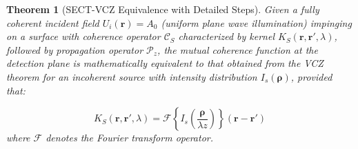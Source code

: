 \documentclass[a4paper,12pt]{article}
\newtheorem{theorem}{Theorem}[section]
\begin{document}
\begin{theorem}[SECT-VCZ Equivalence with Detailed Steps]
Given a fully coherent incident field $U_i(\mathbf{r}) = A_0$ (uniform plane wave illumination) impinging on a 
surface with coherence operator $\mathcal{C}_S$ characterized by kernel $K_S(\mathbf{r}, \mathbf{r}', \lambda)$, 
followed by propagation operator $\mathcal{P}_z$, the mutual coherence function at the detection plane is mathematically 
equivalent to that obtained from the VCZ theorem for an incoherent source with intensity distribution $I_s(\mathbf{\rho})$, 
provided that:

\begin{equation}
K_S(\mathbf{r}, \mathbf{r}', \lambda) = \mathcal{F}\left\{I_s\left(\frac{\mathbf{\rho}}{\lambda z}\right)\right\}(\mathbf{r} - \mathbf{r}')
\end{equation}
where $\mathcal{F}$ denotes the Fourier transform operator.
\end{theorem}
\end{document}
